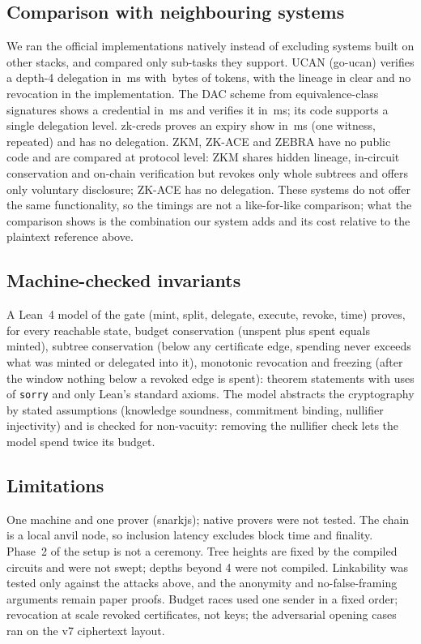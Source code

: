 \subsection{Comparison with neighbouring systems}
\label{subsec:eval-baselines}
We ran the official implementations natively instead of excluding systems built on other stacks, and compared only sub-tasks they support.
UCAN (go-ucan) verifies a depth-4 delegation in \NUcanVerifyD\,ms with \NUcanBytesD\,bytes of tokens, with the lineage in clear and no revocation
in the implementation. The DAC scheme from equivalence-class signatures shows a credential in \NDacShowA\,ms and verifies it in \NDacVerifyA\,ms;
its code supports a single delegation level. zk-creds proves an expiry show in \NZkcMono\,ms (one witness, repeated) and has no delegation.
ZKM, ZK-ACE and ZEBRA have no public code and are compared at protocol level: ZKM shares hidden lineage, in-circuit conservation and on-chain
verification but revokes only whole subtrees and offers only voluntary disclosure; ZK-ACE has no delegation. These systems do not offer the same
functionality, so the timings are not a like-for-like comparison; what the comparison shows is the combination our system adds and its cost
relative to the plaintext reference above.

\subsection{Machine-checked invariants}
\label{subsec:eval-lean}
A Lean~4 model of the gate (mint, split, delegate, execute, revoke, time) proves, for every reachable state, budget conservation (unspent plus spent
equals minted), subtree conservation (below any certificate edge, spending never exceeds what was minted or delegated into it), monotonic
revocation and freezing (after the window nothing below a revoked edge is spent): \NLeanStmts{} theorem statements with \NLeanSorry{} uses of
\texttt{sorry} and only Lean's standard axioms. The model abstracts the cryptography by stated assumptions (knowledge soundness, commitment binding,
nullifier injectivity) and is checked for non-vacuity: removing the nullifier check lets the model spend twice its budget.

\subsection{Limitations}
\label{subsec:eval-limits}
One machine and one prover (snarkjs); native provers were not tested. The chain is a local anvil node, so inclusion latency excludes block time
and finality. Phase~2 of the setup is not a ceremony. Tree heights are fixed by the compiled circuits and were not swept; depths beyond 4 were not
compiled. Linkability was tested only against the attacks above, and the anonymity and no-false-framing arguments remain paper proofs. Budget races used
one sender in a fixed order; revocation at scale revoked certificates, not keys; the adversarial opening cases ran on the v7 ciphertext layout.
